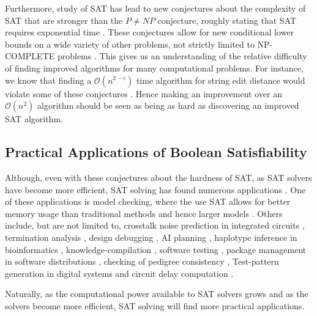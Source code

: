 Furthermore, study of SAT has lead to new conjectures about
the complexity of SAT that are stronger than
the $P \neq NP$ conjecture, roughly stating that SAT requires exponential time \cite{impagliazzo2001complexity}. These conjectures allow for new conditional lower
bounds on a wide variety of other problems, not strictly limited to
NP-COMPLETE problems \cite{vassilevska2015hardness, lokshtanov2013lower}.
This gives us an understanding of the relative difficulty of finding
improved algorithms for many computational problems. For instance,
we know that finding a $\mathcal{O}(n^{2 - \epsilon})$ time algorithm
for string edit distance would violate some of these conjectures \cite{vassilevska2015hardness, levenshtein1966binary}. Hence making an improvement over an $\mathcal{O}(n^2)$ algorithm
should be seen as being as hard as discovering an improved SAT algorithm.

\subsection[Practical Applications]{Practical Applications of Boolean Satisfiability}
Although, even with these conjectures about the hardness of SAT,
as SAT solvers have become more efficient, SAT solving has found numerous applications \cite{marques2008practical, sat2009theory}.
One of these applications is model checking, where
the use SAT allows for better memory usage than traditional methods and hence larger models \cite{biere1999symbolic}.
Others include, but are not limited to, crosstalk noise prediction in integrated circuits \cite{chen1999towards},
termination analysis \cite{fuhs2007sat}, design debugging \cite{smith2005fault}, AI planning \cite{kautz1992planning},
haplotype  inference  in  bioinformatics \cite{lynce2006efficient}, knowledge-compilation \cite{darwiche2004new},
software testing \cite{khurshid2004testera}, package management in software distributions \cite{tucker2007opium},
checking of pedigree consistency \cite{10.1007/978-3-540-71209-1_26}, Test-pattern generation in digital systems
\cite{larrabee1992test} and circuit delay computation \cite{mcgeer1991timing}.

Naturally, as the computational power available to SAT solvers grows and as the
solvers become more efficient, SAT solving will find more
practical applications.

